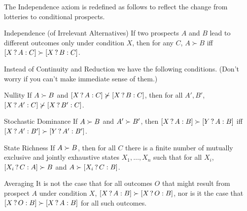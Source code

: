 The Independence axiom is redefined as follows to reflect the change
from lotteries to conditional prospects.
%
%
\begin{genericthm}{Independence (of Irrelevant Alternatives)} 
  If two prospects $A$ and $B$ lead to different outcomes only under
  condition $X$, then for any $C$, $A \succ B$ iff $[X\,?\, A :C]
  \succ [X\,?\, B :C]$.
\end{genericthm}

Instead of Continuity and Reduction we have the following
conditions. (Don't worry if you can't make immediate sense of them.)
%
\begin{genericthm}{Nullity} 
  If $A \succ B$ and $[X\,?\, A :C] \not\succ [X\,?\, B :C]$, then
  for all $A',B'$, $[X\,?\, A' :C] \not\succ [X\,?\, B' :C]$.
\end{genericthm}
%
\vspace{-2mm}
\begin{genericthm}{Stochastic Dominance} 
  If $A \succ B$ and $A'\succ B'$, then $[X\,?\, A :B] \succ
  [Y\,?\, A :B]$ iff $[X\,?\, A' :B'] \succ [Y\,?\, A' :B']$.
\end{genericthm}
%
\vspace{-2mm}
\begin{genericthm}{State Richness} 
  If $A \succ B$, then for all $C$ there is a finite number of
  mutually exclusive and jointly exhaustive states $X_1,\ldots,X_n$
  such that for all $X_i$, $[X_i\,?\, C :A] \succ B$ and $A \succ
  [X_i\,?\, C :B]$.
\end{genericthm}
%
\vspace{-2mm}
\begin{genericthm}{Averaging} 
  It is not the case that for all outcomes $O$ that might result from
  prospect $A$ under condition $X$, $[X\,?\, A :B] \succ
  [X\,?\, O :B]$, nor is it the case that $[X\,?\, O :B] \succ
  [X\,?\, A :B]$ for all such outcomes.
\end{genericthm}

  
